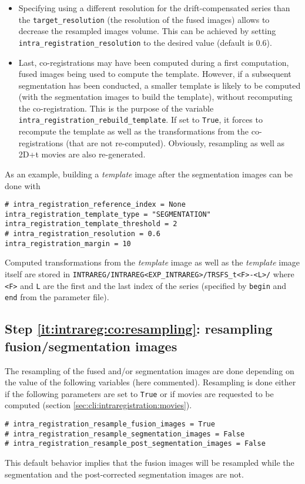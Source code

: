 \begin{itemize}
\item Specifying  using a different resolution for the drift-compensated series than the
\verb|target_resolution| (the resolution of the fused images) allows
to decrease the resampled images volume. This can be achieved by
setting \verb|intra_registration_resolution| to the desired  value  (default is 0.6).

\item 
Last, co-registrations may have been computed during a first
computation, fused images being used to compute the template. However,
if  a subsequent segmentation has been conducted, a smaller template
is likely to be computed (with the segmentation images to build the
template), without recomputing the co-registration. This is the
purpose of the variable
\texttt{intra\_registration\_rebuild\_template}.
If set to \texttt{True}, it forces to recompute the template as well
as the transformations from the co-registrations (that are not
re-computed). Obviously, resampling as well as 2D+t movies are also
re-generated.
\end{itemize}

As an example, building a \textit{template} image after the segmentation images can be done with
\begin{verbatim}
# intra_registration_reference_index = None
intra_registration_template_type = "SEGMENTATION"
intra_registration_template_threshold = 2
# intra_registration_resolution = 0.6
intra_registration_margin = 10
\end{verbatim}


Computed transformations from the \textit{template} image as well as the \textit{template} image itself are stored in \verb|INTRAREG/INTRAREG<EXP_INTRAREG>/TRSFS_t<F>-<L>/| where \verb|<F>| and \verb|L| are the first and the last index of the series (specified by \verb|begin| and \verb|end| from the parameter file).


\subsection{Step \ref{it:intrareg:co:resampling}: resampling fusion/segmentation images}
\label{sec:cli:intraregistration:resampling}

The resampling of the fused and/or segmentation images are done
depending on the value of the following variables (here commented). Resampling is done
either if the following parameters are set to \verb|True| or if movies
are requested to be computed (section \ref{sec:cli:intraregistration:movies}).
\begin{verbatim}
# intra_registration_resample_fusion_images = True
# intra_registration_resample_segmentation_images = False
# intra_registration_resample_post_segmentation_images = False
\end{verbatim}
This default behavior implies that the fusion images will be resampled
while the segmentation and the post-corrected segmentation images are not.


